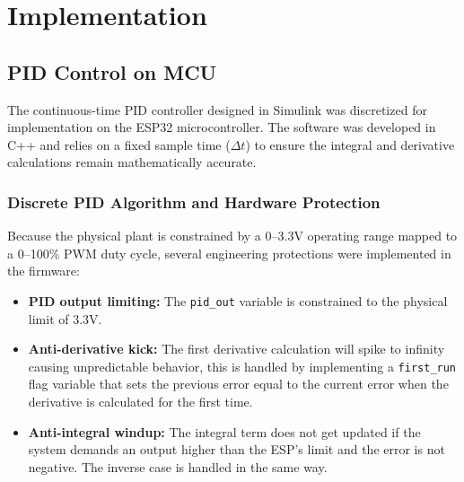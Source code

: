 \section{Implementation}
\subsection{PID Control on MCU}

The continuous-time PID controller designed in Simulink was discretized for implementation on the ESP32 microcontroller.
The software was developed in C++ and relies on a fixed sample time ($\Delta t$) to ensure the integral and derivative calculations remain mathematically accurate.

\subsubsection{Discrete PID Algorithm and Hardware Protection}
Because the physical plant is constrained by a 0--3.3V operating range mapped to a 0--100\% PWM duty cycle, several engineering protections were implemented in the firmware:

\begin{itemize}
    \item \textbf{PID output limiting:} The \texttt{pid\_out} variable is constrained to the physical limit of 3.3V.
    \item \textbf{Anti-derivative kick:} The first derivative calculation will spike to infinity causing unpredictable behavior, this is handled by implementing a \texttt{first\_run} flag variable that sets the previous error equal to the current error when the derivative is calculated for the first time.
    \item \textbf{Anti-integral windup:} The integral term does not get updated if the system demands an output higher than the ESP's limit and the error is not negative. The inverse case is handled in the same way.
\end{itemize}

